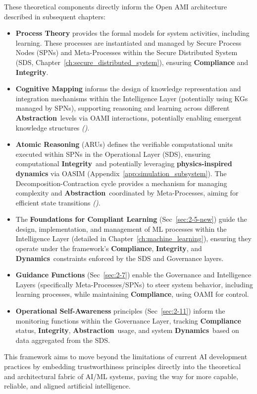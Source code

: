 \documentclass[12pt,a4paper]{report}
\renewcommand{\citep}[1]{\textit{\scriptsize{(\cite{#1})}}}
\newcommand{\Integrity}{\textbf{Integrity}}
\newcommand{\Abstraction}{\textbf{Abstraction}}
\newcommand{\Dynamics}{\textbf{Dynamics}}
\begin{document}
	These theoretical components directly inform the Open AMI architecture described in subsequent chapters:
	\begin{itemize}
		\item \textbf{Process Theory} provides the formal models for system activities, including learning. These processes are instantiated and managed by Secure Process Nodes (SPNs) and Meta-Processes within the Secure Distributed System (SDS, Chapter~\ref{ch:secure_distributed_system}), ensuring \textbf{Compliance} and \Integrity.
		\item \textbf{Cognitive Mapping} informs the design of knowledge representation and integration mechanisms within the Intelligence Layer (potentially using KGs managed by SPNs), supporting reasoning and learning across different \Abstraction\ levels via OAMI interactions, potentially enabling emergent knowledge structures \citep{Buehler2025AgenticGraphRef}.
		\item \textbf{Atomic Reasoning} (ARUs) defines the verifiable computational units executed within SPNs in the Operational Layer (SDS), ensuring computational \Integrity\ and potentially leveraging \textbf{physics-inspired dynamics} via OASIM (Appendix~\ref{app:simulation_subsystem}). The Decomposition-Contraction cycle provides a mechanism for managing complexity and \Abstraction\ coordinated by Meta-Processes, aiming for efficient state transitions \citep{Teng2025AtomOfThoughtsRef}.
		\item The \textbf{Foundations for Compliant Learning} (Sec~\ref{sec:2-5-new}) guide the design, implementation, and management of ML processes within the Intelligence Layer (detailed in Chapter~\ref{ch:machine_learning}), ensuring they operate under the framework's \textbf{Compliance}, \Integrity, and \Dynamics\ constraints enforced by the SDS and Governance layers.
		\item \textbf{Guidance Functions} (Sec~\ref{sec:2-7}) enable the Governance and Intelligence Layers (specifically Meta-Processes/SPNs) to steer system behavior, including learning processes, while maintaining \textbf{Compliance}, using OAMI for control.
		\item \textbf{Operational Self-Awareness} principles (Sec~\ref{sec:2-11}) inform the monitoring functions within the Governance Layer, tracking \textbf{Compliance} status, \Integrity, \Abstraction\ usage, and system \Dynamics\ based on data aggregated from the SDS.
	\end{itemize}
	
	This framework aims to move beyond the limitations of current AI development practices by embedding trustworthiness principles directly into the theoretical and architectural fabric of AI/ML systems, paving the way for more capable, reliable, and aligned artificial intelligence.
	
\end{document}
